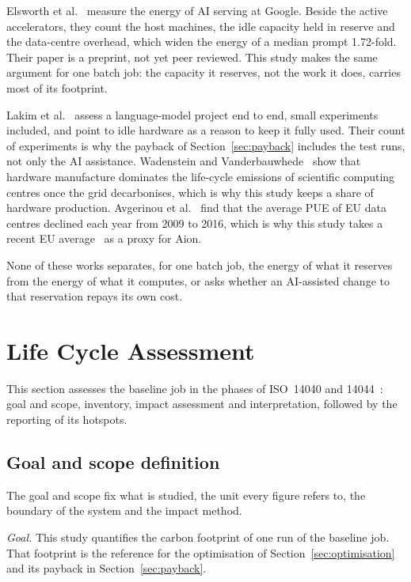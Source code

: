 \documentclass[conference,a4paper]{IEEEtran}
\begin{document}
Elsworth et al.~\cite{elsworth2025} measure the energy of AI serving at Google.
Beside the active accelerators, they count the host machines, the idle capacity
held in reserve and the data-centre overhead, which widen the energy of a median
prompt 1.72-fold. Their paper is a preprint, not yet peer reviewed. This study
makes the same argument for one batch job: the capacity it reserves, not the
work it does, carries most of its footprint.

Lakim et al.~\cite{lakim2022} assess a language-model project end to end,
small experiments included, and point to idle hardware as a reason to keep it
fully used. Their count of experiments is why the payback of
Section~\ref{sec:payback} includes the test runs, not only the AI assistance.
Wadenstein and Vanderbauwhede~\cite{wadenstein2025} show that hardware
manufacture dominates the life-cycle emissions of scientific computing centres
once the grid decarbonises, which is why this study keeps a share of hardware
production. Avgerinou et al.~\cite{avgerinou2017} find that the average PUE of
EU data centres declined each year from 2009 to 2016, which is why this study
takes a recent EU average~\cite{eudc2025} as a proxy for Aion.

None of these works separates, for one batch job, the energy of what it
reserves from the energy of what it computes, or asks whether an AI-assisted
change to that reservation repays its own cost.

\section{Life Cycle Assessment}\label{sec:lca}
This section assesses the baseline job in the phases of ISO~14040 and
14044~\cite{iso14040,iso14044}: goal and scope, inventory, impact assessment and
interpretation, followed by the reporting of its hotspots.

\subsection{Goal and scope definition}\label{sec:goalscope}
The goal and scope fix what is studied, the unit every figure refers to, the
boundary of the system and the impact method.

\emph{Goal.} This study quantifies the carbon footprint of one run of the
baseline job. That footprint is the reference for the optimisation of
Section~\ref{sec:optimisation} and its payback in Section~\ref{sec:payback}.
\end{document}

